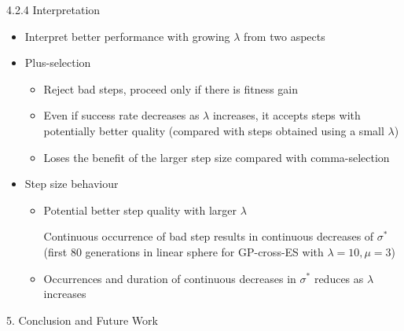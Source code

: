 \documentclass{beamer}
\begin{document}
\begin{frame}{4.2.4 Interpretation}
\begin{itemize}
    \item Interpret better performance with growing $\lambda$ from two aspects
    \item Plus-selection  
        \begin{itemize}
            \item Reject bad steps, proceed only if there is fitness gain
            \item Even if success rate decreases as $\lambda$ increases, it accepts steps with potentially better quality (compared with steps obtained using a small $\lambda$)
            \item Loses the benefit of the larger step size compared with comma-selection
        \end{itemize}
    \item Step size behaviour
    \begin{itemize}
            \item Potential better step quality with larger $\lambda$
            
            Continuous occurrence of bad step results in continuous decreases of $\sigma^*$ (first 80 generations in linear sphere for GP-cross-ES with $\lambda=10,\mu=3$) 
            \item Occurrences and duration of continuous decreases in $\sigma^*$ reduces as $\lambda$ increases
    \end{itemize}
    
\end{itemize}

\end{frame}

\begin{frame}[plain,c]
\begin{center}
\Huge 5. Conclusion and Future Work
\end{center}
\end{frame}
\end{document}
